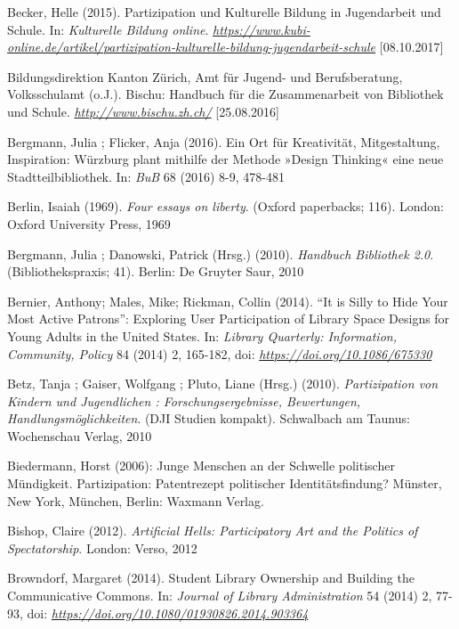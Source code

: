 \documentclass[a4paper,
fontsize=11pt,
oneside,
numbers=noperiodatend,
parskip=half-,
bibliography=totoc,
final
]{scrartcl}
\begin{document}
Becker, Helle (2015). Partizipation und Kulturelle Bildung in
Jugendarbeit und Schule. In: \emph{Kulturelle Bildung online}.
\href{https://www.kubi-online.de/artikel/partizipation-kulturelle-bildung-jugendarbeit-schule}{\emph{https://www.kubi-online.de/artikel/partizipation-kulturelle-bildung-jugendarbeit-schule}}
{[}08.10.2017{]}

Bildungsdirektion Kanton Zürich, Amt für Jugend- und Berufsberatung,
Volksschulamt (o.J.). Bischu: Handbuch für die Zusammenarbeit von
Bibliothek und Schule.
\href{http://www.bischu.zh.ch/}{\emph{http://www.bischu.zh.ch/}}
{[}25.08.2016{]}

Bergmann, Julia ; Flicker, Anja (2016). Ein Ort für Kreativität,
Mitgestaltung, Inspiration: Würzburg plant mithilfe der Methode »Design
Thinking« eine neue Stadtteilbibliothek. In: \emph{BuB} 68 (2016) 8-9,
478-481

Berlin, Isaiah (1969). \emph{Four essays on liberty}. (Oxford
paperbacks; 116). London: Oxford University Press, 1969

Bergmann, Julia ; Danowski, Patrick (Hrsg.) (2010). \emph{Handbuch
Bibliothek 2.0}. (Bibliothekspraxis; 41). Berlin: De Gruyter Saur, 2010

Bernier, Anthony; Males, Mike; Rickman, Collin (2014). \enquote{It is
Silly to Hide Your Most Active Patrons}: Exploring User Participation of
Library Space Designs for Young Adults in the United States. In:
\emph{Library Quarterly: Information, Community, Policy} 84 (2014) 2,
165-182, doi:
\href{https://doi.org/10.1086/675330}{\emph{https://doi.org/10.1086/675330}}

Betz, Tanja ; Gaiser, Wolfgang ; Pluto, Liane (Hrsg.) (2010).
\emph{Partizipation von Kindern und Jugendlichen : Forschungsergebnisse,
Bewertungen, Handlungsmöglichkeiten}. (DJI Studien kompakt). Schwalbach
am Taunus: Wochenschau Verlag, 2010

Biedermann, Horst (2006): Junge Menschen an der Schwelle politischer
Mündigkeit. Partizipation: Patentrezept politischer Identitätsfindung?
Münster, New York, München, Berlin: Waxmann Verlag.

Bishop, Claire (2012). \emph{Artificial Hells: Participatory Art and the
Politics of Spectatorship}. London: Verso, 2012

Browndorf, Margaret (2014). Student Library Ownership and Building the
Communicative Commons. In: \emph{Journal of Library Administration} 54
(2014) 2, 77-93, doi:
\href{https://doi.org/10.1080/01930826.2014.903364}{\emph{https://doi.org/10.1080/01930826.2014.903364}}
\end{document}
